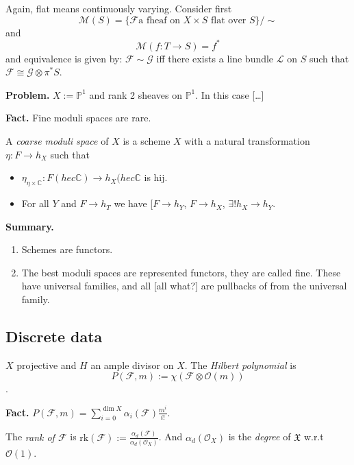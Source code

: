 \bigskip\noindent

Again, flat means continuously varying. Consider first
$$
\mathcal{M}(S)=\{\mathcal{F}\text{a fheaf on $X\times S$ flat over }S\}/\sim
$$
and
$$
\mathcal{M}(f:T \to S)=f^*
$$
and equivalence is given by: $\mathcal{F}\sim \mathcal{G}$ iff there exists a
line bundle $\mathcal{L}$ on $S$ such that 
$\mathcal{F}\cong \mathcal{G}\otimes\pi^*S$.

{\bf Problem.} $X:=\mathbb{P}^1$ and rank 2 sheaves on $\mathbb{P}^1$. In this
case […]

{\bf Fact.} Fine moduli spaces are rare.

\begin{definition}
\label{definition-coarse-moduli-space}
A {\it coarse moduli space} of  $X$ is a scheme $X$ with a natural
transformation $\eta:F \to h_X$ such that
\begin{itemize}
\item $\eta_{\eta \times \mathbb{C}}:F(hec \mathbb{C}) \to h_X(hec \mathbb{C}$
is hij.
\item For all $Y$ and $F \to h_T$ we have [$F \to h_Y$, $F\to h_X$, $\exists !
h_X \to h_Y$.
\end{itemize}
\end{definition}

{\bf Summary.}
\begin{enumerate}
\item Schemes are functors.
\item The best moduli spaces are represented functors, they are called fine.
These have universal families, and all [all what?] are pullbacks of from the
universal family.
\end{enumerate}

\subsection{Discrete data}
\label{subsection-discrete-data}

$X$ projective and $H$ an ample divisor on $X$. The {\it Hilbert polynomial} is
$$
P(\mathcal{F},m):=\chi(\mathcal{F}\otimes \mathcal{O}(m))
$$.

{\bf Fact.} $P(\mathcal{F},m)=\sum_{i=0}^{\dim
X}\alpha_i(\mathcal{F})\frac{m^i}{i!}$.

The {\it rank of $\mathcal{F}$} is
$\text{rk}(\mathcal{F}):=\frac{\alpha_d(\mathcal{F})}{\alpha_d(\mathcal{O}_X)}$.
And $\alpha_d(\mathcal{O}_X)$ is the {\it degree} of $\mathfrak{X}$ w.r.t
$\mathcal{O}(1)$.

